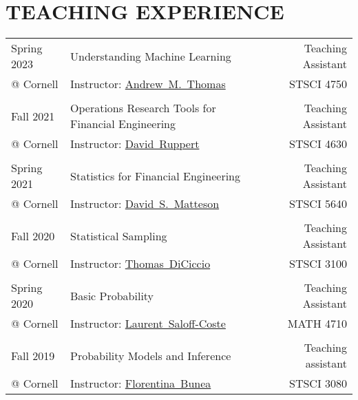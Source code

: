\documentclass[pdftex,11pt]{article}	%
\begin{document}
\section*{TEACHING EXPERIENCE}
\begin{tabularx}{\textwidth}{ @{} p{2.7cm}  X  r @{}}
	Spring 2023 & Understanding Machine Learning & Teaching Assistant \\
	@ Cornell & Instructor: \mbox{\href{https://people.cam.cornell.edu/amt269/}{Andrew M. Thomas}} & STSCI 4750 \\
	& & \\
	Fall 2021 & Operations Research Tools for Financial Engineering & Teaching Assistant \\ 
	@ Cornell & Instructor: \mbox{\href{https://people.orie.cornell.edu/davidr/}{David Ruppert}} & STSCI 4630 \\
	& & \\
	Spring 2021 & Statistics for Financial Engineering & Teaching Assistant \\ 
	@ Cornell & Instructor: \mbox{\href{https://davidsmatteson.com/}{David S. Matteson}} & STSCI 5640 \\
	& & \\
	Fall 2020 & Statistical Sampling & Teaching Assistant \\ 
	@ Cornell & Instructor: \mbox{\href{https://www.ilr.cornell.edu/people/thomas-diciccio}{Thomas DiCiccio}} & STSCI 3100 \\
	& & \\
	Spring 2020 & Basic Probability & Teaching Assistant \\ 
	@ Cornell & Instructor: \mbox{\href{http://pi.math.cornell.edu/~lsc/lau.html}{Laurent Saloff-Coste}} & MATH 4710 \\
	& & \\
	Fall 2019 & Probability Models and Inference & Teaching assistant \\
	@ Cornell & Instructor: \mbox{\href{https://bunea.stat.cornell.edu/}{Florentina Bunea}} & STSCI 3080 \\
\end{tabularx} 

\end{document}
